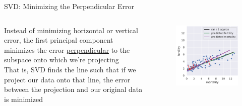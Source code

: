 \documentclass[aspectratio=169]{../latex_main/tntbeamer}  %
\begin{document}
	
	\begin{frame}{SVD: Minimizing the Perpendicular Error}
	    \begin{columns}
	        \begin{column}{.5\textwidth}
	                Instead of minimizing horizontal or vertical error, the first principal component minimizes the error \underline{perpendicular} to the subspace onto which we’re projecting\\
	                \bigskip
	                That is, SVD finds the line such that if we project our data onto that line, the error between the projection and our original data is minimized
	        \end{column}
	        
	        
	        \begin{column}{.5\textwidth}
	                \begin{figure}
	                    \centering
	                    \includegraphics[scale=.5]{Bild22}
	                \end{figure}
	        \end{column}
	        
	        
	    \end{columns}

	\end{frame}
\end{document}
